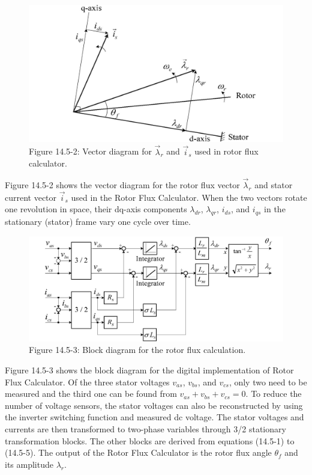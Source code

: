 \documentclass[letterpaper,12pt]{article}
\begin{document}
\begin{figure}[h]
\centering
\includegraphics{graficos/img14.jpg}
\caption{Figure 14.5-2: Vector diagram for $\vec{\lambda}_r$ and $\vec{i}_s$ used in rotor flux calculator.}
\end{figure}
\FloatBarrier

Figure 14.5-2 shows the vector diagram for the rotor flux vector $\vec{\lambda}_r$ and stator current vector $\vec{i}_s$ used in the Rotor Flux Calculator. When the two vectors rotate one revolution in space, their dq-axis components $\lambda_{dr}$, $\lambda_{qr}$, $i_{ds}$, and $i_{qs}$ in the stationary (stator) frame vary one cycle over time.

\begin{figure}[h]
\centering
\includegraphics{graficos/img15.jpg}
\caption{Figure 14.5-3: Block diagram for the rotor flux calculation.}
\end{figure}
\FloatBarrier

Figure 14.5-3 shows the block diagram for the digital implementation of Rotor Flux Calculator. Of the three stator voltages $v_{as}$, $v_{bs}$, and $v_{cs}$, only two need to be measured and the third one can be found from $v_{as} + v_{bs} + v_{cs} = 0$. To reduce the number of voltage sensors, the stator voltages can also be reconstructed by using the inverter switching function and measured dc voltage. The stator voltages and currents are then transformed to two-phase variables through 3/2 stationary transformation blocks. The other blocks are derived from equations (14.5-1) to (14.5-5). The output of the Rotor Flux Calculator is the rotor flux angle $\theta_f$ and its amplitude $\lambda_r$.
\end{document}
